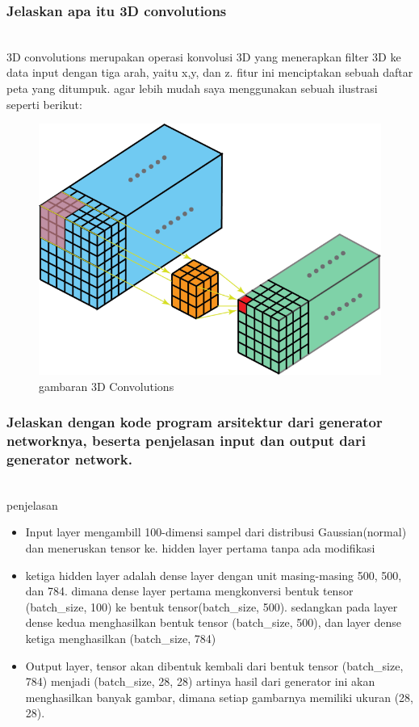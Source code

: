 \subsubsection{Jelaskan apa itu 3D convolutions}
\hfill\\
3D convolutions merupakan operasi konvolusi 3D yang menerapkan filter 3D ke data input dengan tiga arah, yaitu x,y, dan z. fitur ini menciptakan sebuah daftar peta yang ditumpuk. agar lebih mudah saya menggunakan sebuah ilustrasi seperti berikut:
\begin{figure}[H]
	\centering
	\includegraphics[scale=0.5]{figures/1174079/8/3dconvolutions.png}
	\caption{gambaran 3D Convolutions}
\end{figure}

\subsubsection{Jelaskan dengan kode program arsitektur dari generator networknya, beserta penjelasan input dan output dari generator network.}
\hfill\\

penjelasan
\begin{itemize}
	\item Input layer mengambill 100-dimensi sampel dari distribusi Gaussian(normal) dan meneruskan tensor ke. hidden layer pertama tanpa ada modifikasi
	\item ketiga hidden layer adalah dense layer dengan unit masing-masing 500, 500, dan 784. dimana dense layer pertama mengkonversi bentuk tensor (batch\_size, 100) ke bentuk tensor(batch\_size, 500). sedangkan pada layer dense kedua menghasilkan bentuk tensor (batch\_size, 500), dan layer dense ketiga menghasilkan (batch\_size, 784)
	\item Output layer, tensor akan dibentuk kembali dari bentuk tensor (batch\_size, 784) menjadi (batch\_size, 28, 28) artinya hasil dari generator ini akan menghasilkan banyak gambar, dimana setiap gambarnya memiliki ukuran (28, 28). 
\end{itemize}

